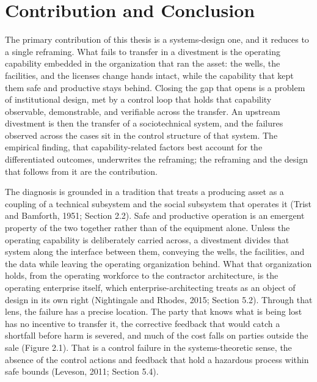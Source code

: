 \documentclass[twoside,fontset=lmodern]{mitthesis}
\begin{document}
\hypertarget{contribution-and-conclusion}{%
\section{Contribution and
Conclusion}\label{contribution-and-conclusion}}

The primary contribution of this thesis is a systems-design one, and it
reduces to a single reframing. What fails to transfer in a divestment is
the operating capability embedded in the organization that ran the
asset: the wells, the facilities, and the licenses change hands intact,
while the capability that kept them safe and productive stays behind.
Closing the gap that opens is a problem of institutional design, met by
a control loop that holds that capability observable, demonstrable, and
verifiable across the transfer. An upstream divestment is then the
transfer of a sociotechnical system, and the failures observed across
the cases sit in the control structure of that system. The empirical
finding, that capability-related factors best account for the
differentiated outcomes, underwrites the reframing; the reframing and
the design that follows from it are the contribution.

The diagnosis is grounded in a tradition that treats a producing asset
as a coupling of a technical subsystem and the social subsystem that
operates it (Trist and Bamforth, 1951; Section 2.2). Safe and productive
operation is an emergent property of the two together rather than of the
equipment alone. Unless the operating capability is deliberately carried
across, a divestment divides that system along the interface between
them, conveying the wells, the facilities, and the data while leaving
the operating organization behind. What that organization holds, from
the operating workforce to the contractor architecture, is the operating
enterprise itself, which enterprise-architecting treats as an object of
design in its own right (Nightingale and Rhodes, 2015; Section 5.2).
Through that lens, the failure has a precise location. The party that
knows what is being lost has no incentive to transfer it, the corrective
feedback that would catch a shortfall before harm is severed, and much
of the cost falls on parties outside the sale (Figure 2.1). That is a
control failure in the systems-theoretic sense, the absence of the
control actions and feedback that hold a hazardous process within safe
bounds (Leveson, 2011; Section 5.4).
\end{document}
